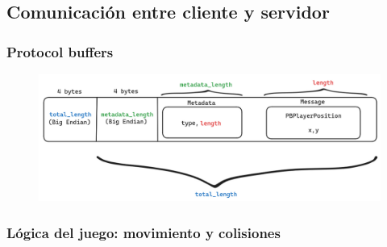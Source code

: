 \subsection{Comunicación entre cliente y servidor}

\subsubsection{Protocol buffers}

\begin{figure}[htbp]
    \centering
    \includegraphics[width=1.0\textwidth]{../assets/protobuf.png}
\end{figure}

\subsubsection{Lógica del juego: movimiento y colisiones}